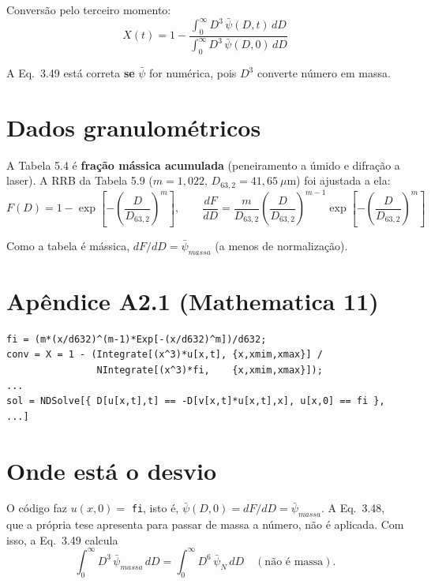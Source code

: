 \documentclass[11pt,a4paper]{article}
\begin{document}
Conversão pelo terceiro momento:
\begin{equation}\tag{3.49}
X(t) = 1 - \frac{\displaystyle\int_0^\infty D^{3}\,\bar\psi(D,t)\,dD}{\displaystyle\int_0^\infty D^{3}\,\bar\psi(D,0)\,dD}
\end{equation}

A Eq.~3.49 está correta \textbf{se} $\bar\psi$ for numérica, pois $D^3$ converte número em massa.

\section{Dados granulométricos}

A Tabela 5.4 é \textbf{fração mássica acumulada} (peneiramento a úmido e difração a laser). A RRB da Tabela 5.9 ($m=1{,}022$, $D_{63,2}=41{,}65\ \mu$m) foi ajustada a ela:
\begin{equation}
F(D) = 1-\exp\!\left[-\left(\frac{D}{D_{63,2}}\right)^{m}\right], \qquad
\frac{dF}{dD} = \frac{m}{D_{63,2}}\left(\frac{D}{D_{63,2}}\right)^{m-1}\exp\!\left[-\left(\frac{D}{D_{63,2}}\right)^{m}\right]
\end{equation}

Como a tabela é mássica, $dF/dD = \bar\psi_{massa}$ (a menos de normalização).

\section{Apêndice A2.1 (Mathematica 11)}

\begin{lstlisting}
fi = (m*(x/d632)^(m-1)*Exp[-(x/d632)^m])/d632;
conv = X = 1 - (Integrate[(x^3)*u[x,t], {x,xmim,xmax}] /
                NIntegrate[(x^3)*fi,    {x,xmim,xmax}]);
...
sol = NDSolve[{ D[u[x,t],t] == -D[v[x,t]*u[x,t],x], u[x,0] == fi }, ...]
\end{lstlisting}

\section{Onde está o desvio}

O código faz $u(x,0) = $ \texttt{fi}, isto é, $\bar\psi(D,0) = dF/dD = \bar\psi_{massa}$. A Eq.~3.48, que a própria tese apresenta para passar de massa a número, não é aplicada. Com isso, a Eq.~3.49 calcula
\begin{equation}
\int_0^\infty D^{3}\,\bar\psi_{massa}\,dD = \int_0^\infty D^{6}\,\bar\psi_{N}\,dD \quad (\text{não é massa}).
\end{equation}
\end{document}
